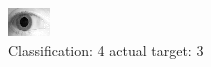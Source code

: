 \begin{figure}[h!]
\begin{center}
\includegraphics[width=0.60\columnwidth]{figures/ID1849_class_4_target_3.png}
\end{center}
\caption{ Classification: 4 actual target: 3}
\label{fig:ID1849_class_4_target_3}
\end{figure}
